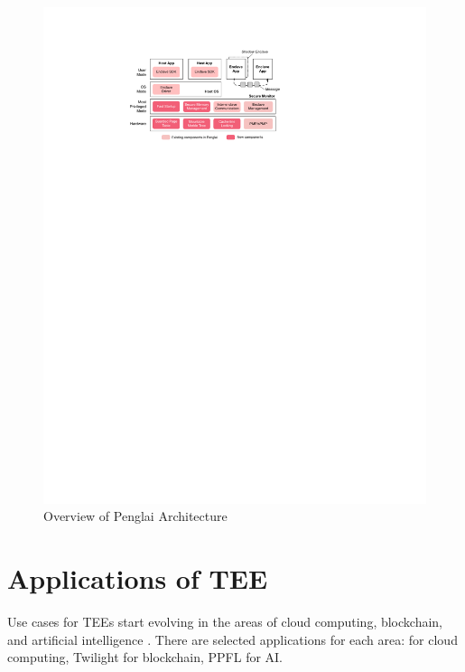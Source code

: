 \documentclass[lang=en]{sjtuarticle}
\begin{document}
\begin{figure}[h]
    \centering
    \includegraphics{penglai.pdf}
    \caption{Overview of Penglai Architecture}
    \label{fig:penglai}
\end{figure}

\section{Applications of TEE}

Use cases for TEEs start evolving in the areas of cloud computing,
blockchain, 
and artificial intelligence \cite{geppert2022trusted}. There are selected applications for each area: for cloud computing, Twilight for blockchain, PPFL for AI.


\end{document}
